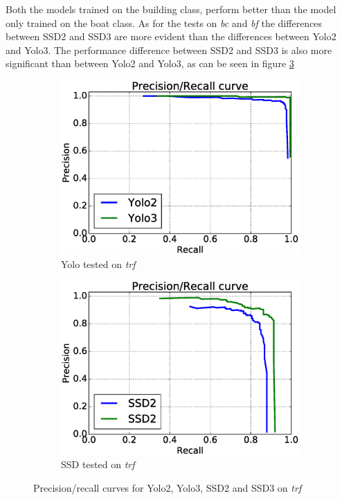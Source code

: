 \vspace{3mm}

Both the models trained on the building class, perform better than the model only trained on the boat class. As for the tests on \textit{bc} and \textit{bf} the differences between SSD2 and SSD3 are more evident than the differences between Yolo2 and Yolo3. The performance difference between SSD2 and SSD3 is also more significant than between Yolo2 and Yolo3, as can be seen in figure \ref{fig:trf_prec}


\begin{figure}[h!]
\begin{subfigure}{.5\textwidth}
  \centering
  \includegraphics[width=0.8\linewidth]{results/case_buildings/prec_recall/yolo/trf.eps}
  \caption{Yolo tested on \textit{trf}}
  \label{fig:ex_trf_prec_rec_yolo}
\end{subfigure}%
\begin{subfigure}{.5\textwidth}
  \centering
  \includegraphics[width=.8\linewidth]{results/case_buildings/prec_recall/ssd/trf.eps}
  \caption{SSD tested on \textit{trf}}
  \label{fig:ex_trf_prec_rec_ssd}
\end{subfigure}
\caption{Precision/recall curves for Yolo2, Yolo3, SSD2 and SSD3 on \textit{trf}}
\label{fig:trf_prec}
\end{figure}

